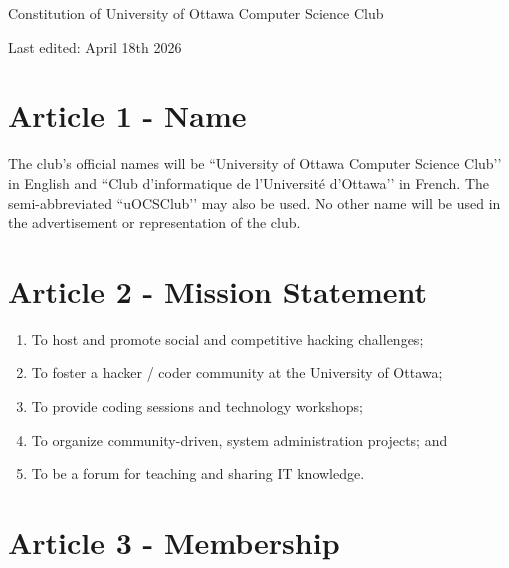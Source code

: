 \begin{center}
{ \LARGE Constitution of University of Ottawa Computer Science Club }

Last edited: April 18th 2026
\end{center}

\section*{Article 1 - Name}

The club’s official names will be ``University of Ottawa Computer Science Club’’ in English
and ``Club d’informatique de l’Université d’Ottawa’’ in French.
The semi-abbreviated ``uOCSClub’’ may also be used.
No other name will be used in the advertisement or representation of the club.

\section*{Article 2 - Mission Statement}


\begin{enumerate}
    \item To host and promote social and competitive hacking challenges;
    \item To foster a hacker / coder community at the University of Ottawa;
    \item To provide coding sessions and technology workshops;
    \item To organize community-driven, system administration projects; and
    \item To be a forum for teaching and sharing IT knowledge.
\end{enumerate}

\section*{Article 3 - Membership}


